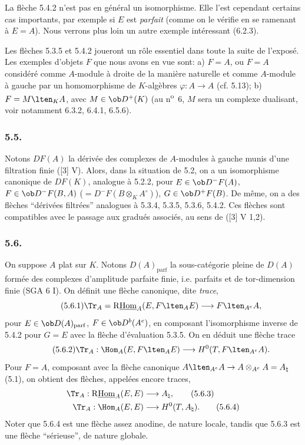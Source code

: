 La flèche 5.4.2 n'est pas en général un isomorphisme. Elle l'est cependant certains cas importants, par exemple si $E$ est \emph{parfait} (comme on le vérifie en se ramenant à $E=A$). Nous verrons plus loin un autre exemple intéressant (6.2.3).

Les flèches 5.3.5 et 5.4.2 joueront un rôle essentiel dans toute la suite de l'exposé. Les exemples d'objets $F$ que nous avons en vue sont: a) $F=A$, ou $F=A$ considéré comme $A$-module à droite de la manière naturelle et comme $A$-module à gauche par un homomorphisme de $K$-algèbres $\varphi:A\to A$ (cf. 5.13); b) $F=M\lten_KA$, avec $M\in\ob D^+(K)$ (au n\textsuperscript{o}~6, $M$ sera un complexe dualisant, voir notamment 6.3.2, 6.4.1, 6.5.6).

\subsubsection*{5.5.}

Notons $DF(A)$ la  dérivée des complexes de $A$-modules à gauche munis d'une filtration finie ([3] V). Alors, dans la situation de 5.2, on a un isomorphisme canonique de $DF(K)$, analogue à 5.2.2, pour $E\in\ob D^-F(A)$, $F\in\ob D^-F(B,A)$ ($=D^-F(B\otimes_KA^\circ)$), $G\in\ob D^+F(B)$. De même, on a des flèches ``dérivées filtrées'' analogues à 5.3.4, 5.3.5, 5.3.6, 5.4.2. Ces flèches sont compatibles avec le passage aux gradués associés, au sens de ([3] V 1,2).

\subsubsection*{5.6.}

On suppose $A$ plat sur $K$. Notons $D(A)_{\mathrm{parf}}$ la sous-catégorie pleine de $D(A)$ formée des complexes d'amplitude parfaite finie, i.e. parfaits et de tor-dimension finie (SGA 6 I). On définit une flèche canonique, dite \emph{trace},
\begin{equation}\tag{5.6.1}
\Tr_A=\mathrm{R}\underline{\mathrm{Hom}}_A(E,F\lten_AE)\longrightarrow F\lten_{A^e}A,
\end{equation}
pour $E\in\ob D(A)_{\mathrm{parf}}$, $F\in\ob D^b(A^e)$, en composant l'isomorphisme inverse de 5.4.2 pour $G=E$ avec la flèche d'évaluation 5.3.5. On en déduit une flèche trace
\begin{equation}\tag{5.6.2}
\Tr_A:\Hom_A(E,F\lten_AE)\longrightarrow H^0(T,F\lten_{A^e}A).
\end{equation}
Pour $F=A$, composant avec la flèche canonique $A\lten_{A^e}A\to A\otimes_{A^e}A=A_\natural$ (5.1), on obtient des flèches, appelées encore traces,
\begin{align}
\Tr_A:\mathrm{R}\underline{\mathrm{Hom}}_A(E,E)&\longrightarrow A_\natural,\tag{5.6.3}\\
\Tr_A:\Hom_A(E,E)&\longrightarrow H^0(T,A_\natural).\tag{5.6.4}
\end{align}
Noter que 5.6.4 est une flèche assez anodine, de nature locale, tandis que 5.6.3 est une flèche ``sérieuse'', de nature globale.


